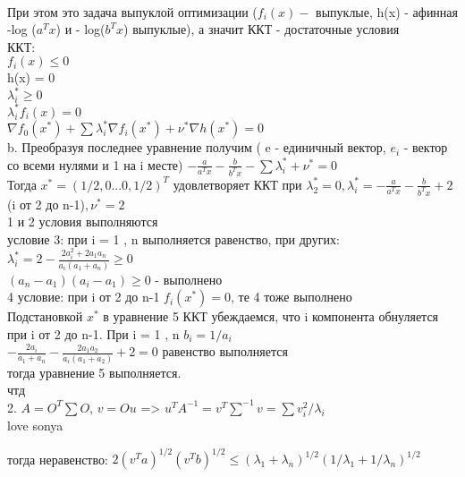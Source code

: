 \documentclass[a4paper,12pt]{article}
\begin{document}
\\При этом это задача выпуклой оптимизации ($f_i(x) - $ выпуклые, h(x) - афинная -log ($a^Tx$) и - log($b^Tx$)  выпуклые), а значит ККТ - достаточные условия \\

ККТ:\\
$f_i(x )\leq 0 $\\
h(x) = 0\\
$\lambda_i^* \geq 0 $\\
$\lambda_i^* f_i(x) = 0$\\
$\nabla f_0(x^*) + \sum \lambda_i^* \nabla f_i(x^*) + \nu^* \nabla h(x^*) = 0 $\\ 

b. Преобразуя последнее уравнение получим ( e - единичный вектор, $e_i$ - вектор со всеми нулями и 1 на i месте) $- \frac{a}{a^Tx} - \frac{b}{b^Tx} - \sum \lambda_i^* + \nu^* = 0 $ \\

Тогда $x^* = (1/2, 0 ... 0, 1/2)^T$ удовлетворяет ККТ при $\lambda_2^* = 0, \lambda_i^*= - \frac{a}{a^Tx} - \frac{b}{b^Tx} + 2$ (i от 2 до n-1)$, \nu^* = 2$ \\

1 и 2 условия выполняются \\
условие 3: при i = 1 , n выполняется равенство, при других:\\

$\lambda_i^* = 2 - \frac{2a_i^2 + 2a_1a_n}{a_i(a_1 + a_n)} \geq 0$\\
$(a_n - a_1)(a_i - a_1) \geq 0$ - выполнено\\

4 условие: при i от 2 до n-1 $f_i(x^*) = 0$, те 4 тоже выполнено\\

Подстановкой $x^* $ в уравнение 5 ККТ убеждаемся, что i компонента обнуляется при i от 2 до n-1. При i = 1 , n $b_i=1/a_i$ \\

$- \frac{2a_i}{a_1+a_n} - \frac{2a_1a_2}{a_i(a_1+a_2)} + 2 = 0 $ равенство выполняется \\
тогда уравнение 5 выполняется. \\ 
чтд \\

2. $A=O^T\sum O$, $v = Ou$ => $u^TA^{-1} = v^T \sum ^{-1}v = \sum v_i^2/\lambda_i $ \\ love sonya 

тогда неравенство: $2(v^Ta)^{1/2}(v^Tb)^{1/2} \leq (\lambda_1 + \lambda_n)^{1/2}(1/\lambda_1 + 1/\lambda_n)^{1/2}$ \\
\end{document}
